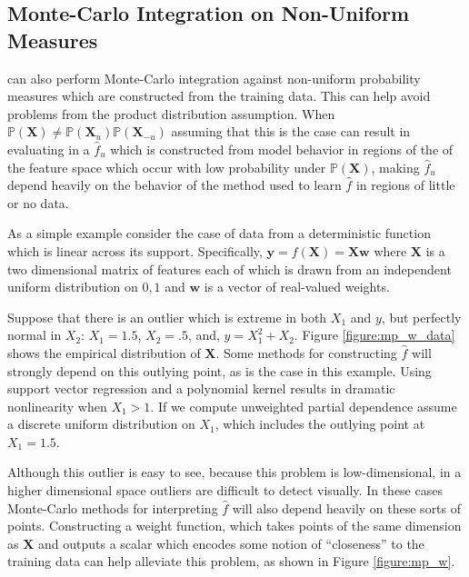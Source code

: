 \subsection{Monte-Carlo Integration on Non-Uniform Measures}

 can also perform Monte-Carlo integration against non-uniform probability measures which are constructed from the training data. This can help avoid problems from the product distribution assumption. When $\mathbb{P}(\mathbf{X}) \neq \mathbb{P}(\mathbf{X}_u)\mathbb{P}(\mathbf{X}_{-u})$ assuming that this is the case can result in evaluating in a $\hat{f}_u$ which is constructed from model behavior in regions of the of the feature space which occur with low probability under $\mathbb{P}(\mathbf{X})$, making $\hat{f}_u$ depend heavily on the behavior of the method used to learn $\hat{f}$ in regions of little or no data.

As a simple example consider the case of data from a deterministic function which is linear across its support. Specifically, $\mathbf{y} = f(\mathbf{X}) = \mathbf{X} \mathbf{w}$ where $\mathbf{X}$ is a two dimensional matrix of features each of which is drawn from an independent uniform distribution on ${0, 1}$ and $\mathbf{w}$ is a vector of real-valued weights.



Suppose that there is an outlier which is extreme in both $X_1$ and $y$, but perfectly normal in $X_2$: $X_1 = 1.5$, $X_2 = .5$, and, $y = X_1^2 + X_2$. Figure \ref{figure:mp_w_data} shows the empirical distribution of $\mathbf{X}$. Some methods for constructing $\hat{f}$ will strongly depend on this outlying point, as is the case in this example. Using support vector regression and a polynomial kernel results in dramatic nonlinearity when $X_1 > 1$. If we compute unweighted partial dependence assume a discrete uniform distribution on $X_1$, which includes the outlying point at $X_1 = 1.5$.

Although this outlier is easy to see, because this problem is low-dimensional, in a higher dimensional space outliers are difficult to detect visually. In these cases Monte-Carlo methods for interpreting $\hat{f}$ will also depend heavily on these sorts of points. Constructing a weight function, which takes points of the same dimension as $\mathbf{X}$ and outputs a scalar which encodes some notion of ``closeness'' to the training data can help alleviate this problem, as shown in Figure \ref{figure:mp_w}. 


